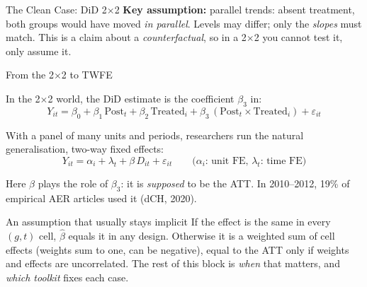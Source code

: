 \documentclass[main.tex]{subfiles}
\begin{document}
\begin{frame}{The Clean Case: DiD 2$\times$2}
  \medskip
  \textbf{Key assumption:} \alert{parallel trends}: absent treatment, both
  groups would have moved \emph{in parallel}. Levels may differ; only the
  \emph{slopes} must match. This is a claim about a \emph{counterfactual},
  so in a 2$\times$2 you cannot test it, only assume it.

\end{frame}

\begin{frame}{From the 2$\times$2 to TWFE}

  In the 2$\times$2 world, the DiD estimate is the coefficient $\beta_3$ in:
  \begin{equation*}
    Y_{it} = \beta_0 + \beta_1\,\text{Post}_t + \beta_2\,\text{Treated}_i
             + \beta_3\,(\text{Post}_t \times \text{Treated}_i) + \varepsilon_{it}
  \end{equation*}

  With a panel of many units and periods, researchers run the natural
  generalisation, \alert{two-way fixed effects}:
  \begin{equation*}
    Y_{it} = \alpha_i + \lambda_t + \beta\,D_{it} + \varepsilon_{it}
    \qquad\text{($\alpha_i$: unit FE, \ \ $\lambda_t$: time FE)}
  \end{equation*}

  \medskip
  Here $\beta$ plays the role of $\beta_3$: it is \emph{supposed} to be the ATT.
  In 2010--2012, 19\% of empirical AER articles used it (dCH, 2020).

  \medskip
  \begin{alertblock}{An assumption that usually stays implicit}
    If the effect is \alert{the same in every $(g,t)$ cell}, $\hat\beta$
    equals it in any design. Otherwise it is a weighted sum of cell effects
    (weights sum to one, \alert{can be negative}), equal to the ATT only if
    weights and effects are uncorrelated. The rest of
    this block is \emph{when} that matters, and \emph{which toolkit} fixes each case.
  \end{alertblock}

\end{frame}
\end{document}
